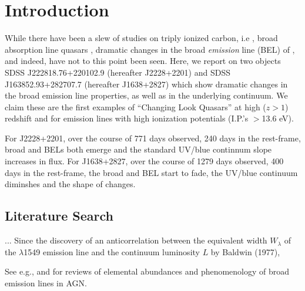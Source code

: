 \documentclass[a4paper,fleqn,usenatbib]{mnras}
\begin{document}
\section{Introduction}
While there have been a slew of studies on triply ionized carbon, i.e \civ, broad absorption line quasars
\citep[BAL QSOs; see e.g. Table 1][]{Hemler2019}, dramatic changes in the 
broad {\it emission} line (BEL) of \civ, and indeed, \ciii have not to this point been seen. 
Here, we report on two objects SDSS J222818.76+220102.9 (hereafter J2228+2201) and 
SDSS J163852.93+282707.7 (hereafter J1638+2827) which show dramatic changes in the \civ broad emission line properties, as well as in the underlying continuum. We claim these are the first examples of ``Changing Look Quasars'' at high ($z>1$) redshift and for emission lines with high ionization potentials (I.P.'s 
$>$13.6 eV). 

For J2228+2201, over the course of 771 days observed, 240 days in the rest-frame, broad \civ and \ciii BELs both emerge and the
standard UV/blue continnum slope increases in flux. 
For J1638+2827, over the course of 1279 days observed, 400 days in the rest-frame, the  broad \civ and \ciii BEL start to fade, 
the UV/blue continuum diminshes and the shape of \lya changes. 


\subsection{Literature Search}
\citet{Baldwin1977}...
Since the discovery of an anticorrelation between the equivalent width $W_{\lambda}$ of the \civ $\lambda$1549 emission line and the continuum luminosity $L$ by Baldwin (1977),





See e.g., \citet{HamannFerland1999} and \citet{Sulentic2000_ARAA} for reviews of 
elemental abundances and phenomenology of broad emission lines in 
AGN. 
\end{document}
